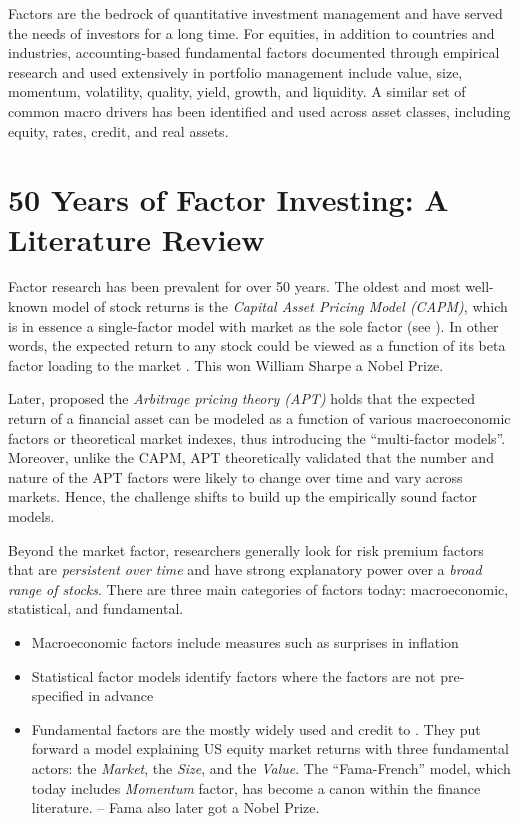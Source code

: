 \documentclass[
]{book}
\begin{document}
Factors are the bedrock of quantitative investment management and have served the needs of investors for a long time. For equities, in addition to countries and industries, accounting-based fundamental factors documented through empirical research and used extensively in portfolio management include value, size, momentum, volatility, quality, yield, growth, and liquidity. A similar set of common macro drivers has been identified and used across asset classes, including equity, rates, credit, and real assets.

\hypertarget{years-of-factor-investing-a-literature-review}{%
\section{50 Years of Factor Investing: A Literature Review}\label{years-of-factor-investing-a-literature-review}}

Factor research has been prevalent for over 50 years. The oldest and most well-known model of stock returns is the {\emph{Capital Asset Pricing Model (CAPM)}}, which is in essence a single-factor model with market as the sole factor (see \citet{sharpe1964capital}). In other words, the expected return to any stock could be viewed as a function of its beta factor loading to the market . This won William Sharpe a Nobel Prize.

Later, \citet{ross1976arbitrage} proposed the {\emph{Arbitrage pricing theory (APT)}} holds that the expected return of a financial asset can be modeled as a function of various macroeconomic factors or theoretical market indexes, thus introducing the ``multi-factor models''. Moreover, unlike the CAPM, APT theoretically validated that the number and nature of the APT factors were likely to change over time and vary across markets. Hence, the challenge shifts to build up the empirically sound factor models.

Beyond the market factor, researchers generally look for risk premium factors that are \emph{persistent over time} and have strong explanatory power over a \emph{broad range of stocks}. There are three main categories of factors today: macroeconomic, statistical, and fundamental.

\begin{itemize}
\item
  Macroeconomic factors include measures such as surprises in inflation \citep{chen1986economic}
\item
  Statistical factor models identify factors where the factors are not pre-specified in advance \citep{chamberlain1983arbitrage}
\item
  Fundamental factors are the mostly widely used and credit to \citet{fama1993common}. They put forward a model explaining US equity market returns with three fundamental actors: the \emph{Market}, the \emph{Size}, and the \emph{Value}. The ``Fama-French'' model, which today includes \citet{carhart1997persistence} \emph{Momentum} factor, has become a canon within the finance literature. -- Fama also later got a Nobel Prize.
\end{itemize}
\end{document}

